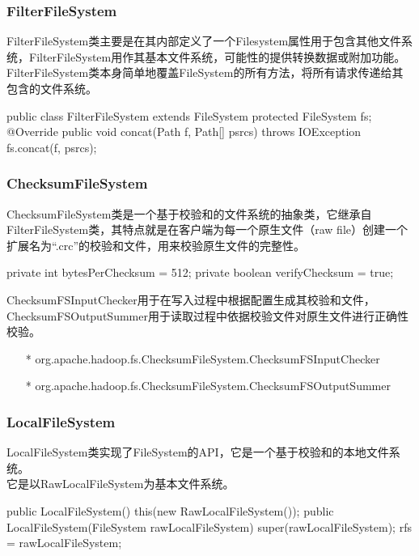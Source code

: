     \subsubsection{FilterFileSystem}
        FilterFileSystem类主要是在其内部定义了一个Filesystem属性用于包含其他文件系统，FilterFileSystem用作其基本文件系统，可能性的提供转换数据或附加功能。\\
        FilterFileSystem类本身简单地覆盖FileSystem的所有方法，将所有请求传递给其包含的文件系统。
        \begin{java}[caption=FilterFileSystem]
public class FilterFileSystem extends FileSystem {
    protected FileSystem fs;
    @Override
    public void concat(Path f, Path[] psrcs) throws IOException {
        fs.concat(f, psrcs);
    }
}
        \end{java}

    \subsubsection{ChecksumFileSystem}
        ChecksumFileSystem类是一个基于校验和的文件系统的抽象类，它继承自FilterFileSystem类，其特点就是在客户端为每一个原生文件（raw file）创建一个扩展名为“.crc”的校验和文件，用来校验原生文件的完整性。
        \begin{java}[caption=ChecksumFileSystem]
private int bytesPerChecksum = 512; 
private boolean verifyChecksum = true; 
        \end{java}
        
        ChecksumFSInputChecker用于在写入过程中根据配置生成其校验和文件，ChecksumFSOutputSummer用于读取过程中依据校验文件对原生文件进行正确性校验。
        \begin{itemize}
            \item[*] org.apache.hadoop.fs.ChecksumFileSystem.ChecksumFSInputChecker      
            \item[*] org.apache.hadoop.fs.ChecksumFileSystem.ChecksumFSOutputSummer
        \end{itemize}

    \subsubsection{LocalFileSystem}
        LocalFileSystem类实现了FileSystem的API，它是一个基于校验和的本地文件系统。\\
        它是以RawLocalFileSystem为基本文件系统。
        \begin{java}[caption=LocalFileSystem]
public LocalFileSystem() {  
    this(new RawLocalFileSystem());  
}  
public LocalFileSystem(FileSystem rawLocalFileSystem) {  
    super(rawLocalFileSystem);  
    rfs = rawLocalFileSystem;  
} 
        \end{java}
        
